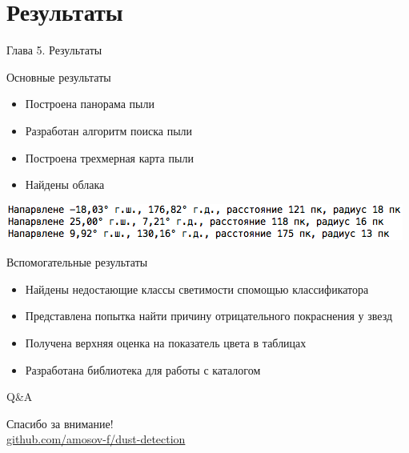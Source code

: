 \documentclass[14pt, fleqn, xcolor={dvipsnames, table}]{beamer}
\begin{document}
	\section{Результаты}            
        
        \begin{frame}
            Глава 5. Результаты
        \end{frame}	
        
        \begin{frame}{Основные результаты}
            \begin{itemize}
            		\item Построена панорама пыли
            		\item Разработан алгоритм поиска пыли
            		\item Построена трехмерная карта пыли
            		\item Найдены облака
            			
			\end{itemize}     
			\begin{center}
            		\includegraphics[scale=0.6]{clouds.png}
            	\end{center}                 
        \end{frame} 
        
        \begin{frame}{Вспомогательные результаты}
            \begin{itemize}
            		\item Найдены недостающие классы светимости спомощью классификатора
            		\item Представлена попытка найти причину отрицательного покраснения у  звезд
            		\item Получена верхняя оценка на показатель цвета в таблицах
            		\item Разработана библиотека для работы с каталогом 
			\end{itemize}                      
        \end{frame} 
        
        \begin{frame}{Q\&A}
            \begin{center}
                Спасибо за внимание!\\
                \href{https://github.com/amosov-f/dust-detection}{github.com/amosov-f/dust-detection}
            \end{center}
        \end{frame}
\end{document}
